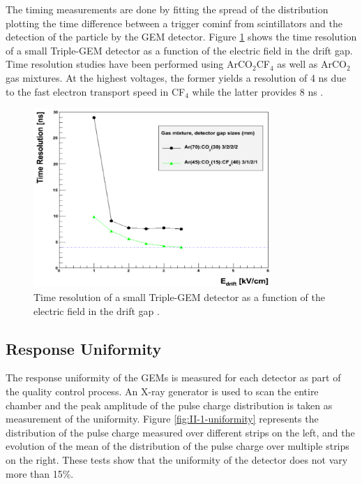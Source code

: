       The timing measurements are done by fitting the spread of the distribution plotting the time difference between a trigger cominf from scintillators and the detection of the particle by the GEM detector. Figure \ref{fig:II-1-time-res} shows the time resolution of a small Triple-GEM detector as a function of the electric field in the drift gap. Time resolution studies have been performed using ArCO$_2$CF$_4$ as well as ArCO$_2$ gas mixtures. At the highest voltages, the former yields a resolution of 4 ns due to the fast electron transport speed in CF$_4$ while the latter provides 8 ns \cite{Thierry:2065693}. \\

      \begin{figure}[t!]
        \centering
        \includegraphics[width=0.8\textwidth]{img/II-1-gem/time-resolution.png}
        \caption{Time resolution of a small Triple-GEM detector as a function of the electric field in the drift gap \cite{Thierry:2065693}.}
        \label{fig:II-1-time-res}
      \end{figure}

    \subsection{Response Uniformity}

      The response uniformity of the GEMs is measured for each detector as part of the quality control process. An X-ray generator is used to scan the entire chamber and the peak amplitude of the pulse charge distribution is taken as measurement of the uniformity. Figure \ref{fig:II-1-uniformity} represents the distribution of the pulse charge measured over different strips on the left, and the evolution of the mean of the distribution of the pulse charge over multiple strips on the right. These tests show that the uniformity of the detector does not vary more than 15\%.

